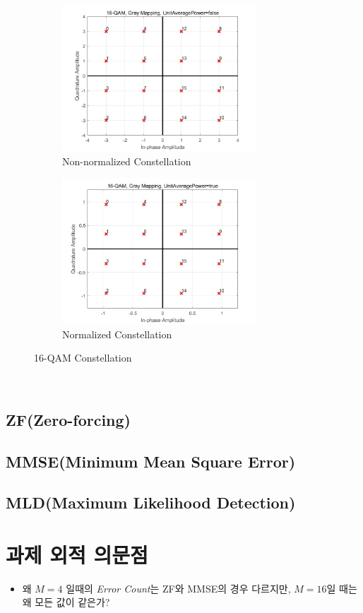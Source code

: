 \documentclass{article}
\begin{document}
\begin{figure}[!ht]
	\centering
	\begin{subfigure}{0.5\textwidth}
		\centerline{\includegraphics[width=0.8\textwidth]{16qamnonunit.jpg}}
		\caption{Non-normalized Constellation}
	\end{subfigure}%
	\begin{subfigure}{0.5\textwidth}
		\centerline{\includegraphics[width=0.8\textwidth]{16qamunit.jpg}}
		\caption{Normalized Constellation}
	\end{subfigure}
	\caption{16-QAM Constellation}
\end{figure}
\\
\subsection{ZF(Zero-forcing)}
\subsection{MMSE(Minimum Mean Square Error)}
\subsection{MLD(Maximum Likelihood Detection)}
\section{과제 외적 의문점}
\begin{itemize}
  \item 왜 $M=4$ 일때의 \textsl{Error Count}는 ZF와 MMSE의 경우 다르지만, $M=16$일 때는 왜 모든 값이 같은가?
\end{itemize}
\end{document}
